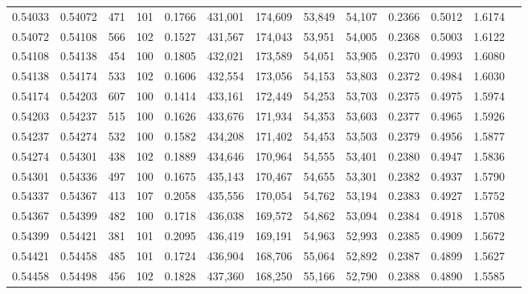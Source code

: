 \begin{tabular}{rrrrrrrrrrrrr}
0.54033 & 0.54072 &   471 & 101 &                                     0.1766 & 431,001 & 174,609 &  53,849 &  54,107 & 0.2366 & 0.5012 & 1.6174 \\
0.54072 & 0.54108 &   566 & 102 &                                     0.1527 & 431,567 & 174,043 &  53,951 &  54,005 & 0.2368 & 0.5003 & 1.6122 \\
0.54108 & 0.54138 &   454 & 100 &                                     0.1805 & 432,021 & 173,589 &  54,051 &  53,905 & 0.2370 & 0.4993 & 1.6080 \\
0.54138 & 0.54174 &   533 & 102 &                                     0.1606 & 432,554 & 173,056 &  54,153 &  53,803 & 0.2372 & 0.4984 & 1.6030 \\
0.54174 & 0.54203 &   607 & 100 &                                     0.1414 & 433,161 & 172,449 &  54,253 &  53,703 & 0.2375 & 0.4975 & 1.5974 \\
0.54203 & 0.54237 &   515 & 100 &                                     0.1626 & 433,676 & 171,934 &  54,353 &  53,603 & 0.2377 & 0.4965 & 1.5926 \\
0.54237 & 0.54274 &   532 & 100 &                                     0.1582 & 434,208 & 171,402 &  54,453 &  53,503 & 0.2379 & 0.4956 & 1.5877 \\
0.54274 & 0.54301 &   438 & 102 &                                     0.1889 & 434,646 & 170,964 &  54,555 &  53,401 & 0.2380 & 0.4947 & 1.5836 \\
0.54301 & 0.54336 &   497 & 100 &                                     0.1675 & 435,143 & 170,467 &  54,655 &  53,301 & 0.2382 & 0.4937 & 1.5790 \\
0.54337 & 0.54367 &   413 & 107 &                                     0.2058 & 435,556 & 170,054 &  54,762 &  53,194 & 0.2383 & 0.4927 & 1.5752 \\
0.54367 & 0.54399 &   482 & 100 &                                     0.1718 & 436,038 & 169,572 &  54,862 &  53,094 & 0.2384 & 0.4918 & 1.5708 \\
0.54399 & 0.54421 &   381 & 101 &                                     0.2095 & 436,419 & 169,191 &  54,963 &  52,993 & 0.2385 & 0.4909 & 1.5672 \\
0.54421 & 0.54458 &   485 & 101 &                                     0.1724 & 436,904 & 168,706 &  55,064 &  52,892 & 0.2387 & 0.4899 & 1.5627 \\
0.54458 & 0.54498 &   456 & 102 &                                     0.1828 & 437,360 & 168,250 &  55,166 &  52,790 & 0.2388 & 0.4890 & 1.5585 \\

\end{tabular}

